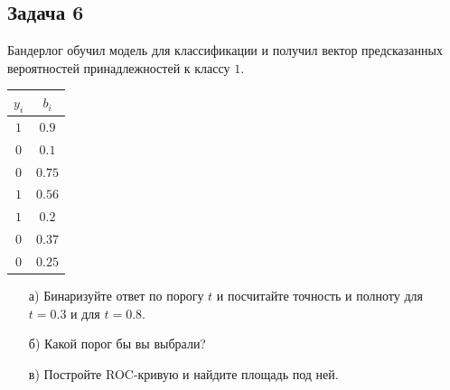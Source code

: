 \documentclass[12pt, a4paper, oneside]{article}
\begin{document}
\subsection*{Задача 6}

Бандерлог обучил модель для классификации и получил вектор предсказанных вероятностей принадлежностей к классу $1$. 

\begin{center}
	\begin{tabular}{c|c}
		$y_i$ & $b_i$ \\
		\hline
		$1$  & $0.9$ \\
		$0$ & $0.1$ \\
		$0$ & $0.75$ \\
		$1$ & $0.56$ \\
		$1$ & $0.2$ \\
		$0$ & $0.37$ \\
		$0$ & $0.25$ \\		
	\end{tabular}
\end{center}

\begin{enumerate}
	\item[а)]  Бинаризуйте ответ по порогу $t$ и посчитайте точность и полноту для $t = 0.3$ и для  $t = 0.8$.
	\item[б)]  Какой порог бы вы выбрали? 
	\item[в)]  Постройте ROC-кривую и найдите площадь под ней. 
\end{enumerate}
\end{document}
